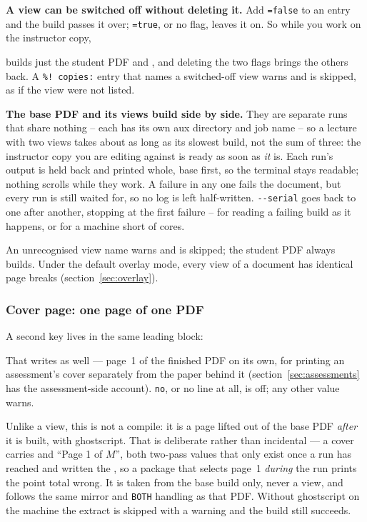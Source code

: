 \textbf{A view can be switched off without deleting it.} Add \texttt{=false}
to an entry and the build passes it over; \texttt{=true}, or no flag, leaves
it on. So while you work on the instructor copy,

\begin{manexsource}
\end{manexsource}

\noindent builds just the student PDF and , and
deleting the two flags brings the others back. A \texttt{\%! copies:} entry
that names a switched-off view warns and is skipped, as if the view were not
listed.

\textbf{The base PDF and its views build side by side.} They are separate
 runs that share nothing -- each has its own aux directory and
job name -- so a lecture with two views takes about as long as its slowest
build, not the sum of three: the instructor copy you are editing against is
ready as soon as \emph{it} is. Each run's output is held back and printed
whole, base first, so the terminal stays readable; nothing scrolls while they
work. A failure in any one fails the document, but every run is still waited
for, so no log is left half-written. \texttt{-{}-serial} goes back to one
after another, stopping at the first failure -- for reading a failing build
as it happens, or for a machine short of cores.

An unrecognised view name warns and is skipped; the student PDF always
builds. Under the default overlay mode, every view of a document has
identical page breaks (section~\ref{sec:overlay}).

\subsubsection{Cover page: one page of one PDF}

A second key lives in the same leading block:

\begin{manexsource}
\end{manexsource}

\noindent That writes  as well --- page~1 of the
finished PDF on its own, for printing an assessment's cover separately from
the paper behind it (section~\ref{sec:assessments} has the assessment-side
account). \texttt{no}, or no line at all, is off; any other value warns.

Unlike a view, this is not a compile: it is a page lifted out of the base
PDF \emph{after} it is built, with ghostscript. That is deliberate rather
than incidental --- a cover carries  and ``Page 1 of
$M$'', both two-pass values that only exist once a run has reached
 and written the , so a package that selects
page~1 \emph{during} the run prints the point total wrong. It is taken from
the base build only, never a view, and follows the same mirror and
\texttt{BOTH} handling as that PDF. Without ghostscript on the machine the
extract is skipped with a warning and the build still succeeds.

